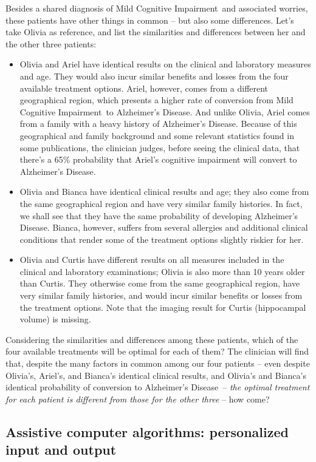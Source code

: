 \documentclass[utf8]{FrontiersinHarvard} %
\renewcommand*{\|}[1][]{\nonscript\:#1\vert\nonscript\:\mathopen{}}
\newcommand*{\ad}{Alzheimer's Disease}
\newcommand*{\mci}{Mild Cognitive Impairment}
\begin{document}
Besides a shared diagnosis of \mci\ and associated worries, these patients have other things in common -- but also some differences. Let's take Olivia as reference, and list the similarities and differences between her and the other three patients:
\begin{itemize}
\item Olivia and Ariel have identical results on the clinical and laboratory measures and age. They would also incur similar benefits and losses from the four available treatment options. Ariel, however, comes from a different geographical region, which presents a higher rate of conversion from \mci\ to \ad. And unlike Olivia, Ariel comes from a family with a heavy history of \ad. Because of this geographical and family background and some relevant statistics found in some publications, the clinician judges, before seeing the clinical data, that there's a 65\% probability that Ariel's cognitive impairment will convert to \ad.

\item Olivia and Bianca have identical clinical results and age; they also come from the same geographical region and have very similar family histories. In fact, we shall see that they have the same probability of developing \ad. Bianca, however, suffers from several allergies and additional clinical conditions that render some of the treatment options slightly riskier for her.

\item Olivia and Curtis have different results on all measures included in the clinical and laboratory examinations; Olivia is also more than 10 years older than Curtis. They otherwise come from the same geographical region, have very similar family histories, and would incur similar benefits or losses from the treatment options. Note that the imaging result for Curtis (hippocampal volume) is missing.
\end{itemize}

Considering the similarities and differences among these patients, which of the four available treatments will be optimal for each of them? The clinician will find that, despite the many factors in common among our four patients -- even despite Olivia's, Ariel's, and Bianca's identical clinical results, and Olivia's and Bianca's identical probability of conversion to \ad\ -- \emph{the optimal treatment for each patient is different from those for the other three} -- how come?

\subsection{Assistive computer algorithms: personalized input and output}
\label{sec:intro_purposes}
\end{document}
